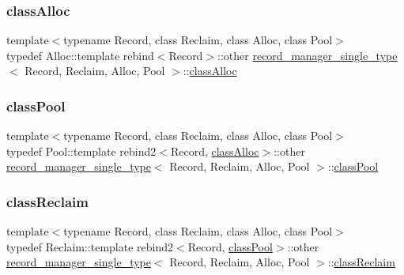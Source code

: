 \subsubsection{\texorpdfstring{class\+Alloc}{classAlloc}}
{\footnotesize\ttfamily template$<$typename Record, class Reclaim, class Alloc, class Pool$>$ \\
typedef Alloc\+::template rebind$<$Record$>$\+::other \hyperlink{classrecord__manager__single__type}{record\+\_\+manager\+\_\+single\+\_\+type}$<$ Record, Reclaim, Alloc, Pool $>$\+::\hyperlink{classrecord__manager__single__type_a5cdd0ef714fadb6eb7818aaf69918625}{class\+Alloc}\hspace{0.3cm}{\ttfamily [protected]}}

\mbox{\label{classrecord__manager__single__type_a2a7217967912e867c7ab6e4a7f3deeb5}} 
\subsubsection{\texorpdfstring{class\+Pool}{classPool}}
{\footnotesize\ttfamily template$<$typename Record, class Reclaim, class Alloc, class Pool$>$ \\
typedef Pool\+::template rebind2$<$Record, \hyperlink{classrecord__manager__single__type_a5cdd0ef714fadb6eb7818aaf69918625}{class\+Alloc}$>$\+::other \hyperlink{classrecord__manager__single__type}{record\+\_\+manager\+\_\+single\+\_\+type}$<$ Record, Reclaim, Alloc, Pool $>$\+::\hyperlink{classrecord__manager__single__type_a2a7217967912e867c7ab6e4a7f3deeb5}{class\+Pool}\hspace{0.3cm}{\ttfamily [protected]}}

\mbox{\label{classrecord__manager__single__type_a831ae4c91e0ba85f07fd6b68ef18f035}} 
\subsubsection{\texorpdfstring{class\+Reclaim}{classReclaim}}
{\footnotesize\ttfamily template$<$typename Record, class Reclaim, class Alloc, class Pool$>$ \\
typedef Reclaim\+::template rebind2$<$Record, \hyperlink{classrecord__manager__single__type_a2a7217967912e867c7ab6e4a7f3deeb5}{class\+Pool}$>$\+::other \hyperlink{classrecord__manager__single__type}{record\+\_\+manager\+\_\+single\+\_\+type}$<$ Record, Reclaim, Alloc, Pool $>$\+::\hyperlink{classrecord__manager__single__type_a831ae4c91e0ba85f07fd6b68ef18f035}{class\+Reclaim}\hspace{0.3cm}{\ttfamily [protected]}}

